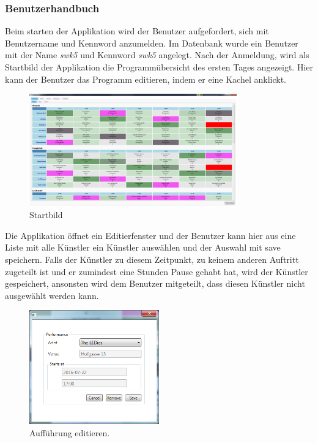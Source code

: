 \documentclass[12pt, a4paper]{article}
\begin{document}
\subsubsection{Benutzerhandbuch}

Beim starten der Applikation wird der Benutzer aufgefordert, sich mit Benutzername und Kennword anzumelden. Im Datenbank wurde ein Benutzer mit der Name \textit{swk5} und Kennword \textit{swk5} angelegt. Nach der Anmeldung, wird als Startbild der Applikation die Programmübersicht des ersten Tages angezeigt. Hier kann der Benutzer das Programm editieren, indem er eine Kachel anklickt. 

\begin{figure}[h] 	
	\centering
		\includegraphics[width=0.8\textwidth]{Startbild.png}
	\caption{Startbild}
\end{figure}

Die Applikation öffnet ein Editierfenster und der Benutzer kann hier aus eine Liste mit alle Künstler ein Künstler auswählen und der Auswahl mit save speichern. Falls der Künstler zu diesem Zeitpunkt, zu keinem anderen Auftritt zugeteilt ist und er zumindest eine Stunden Pause gehabt hat, wird der Künstler gespeichert, ansonsten wird dem Benutzer mitgeteilt, dass diesen Künstler nicht ausgewählt werden kann.

\begin{figure}[h] 	
	\centering
		\includegraphics[width=0.5\textwidth]{EditPerformance.png}
	\caption{Aufführung editieren.}
\end{figure}
\end{document}

